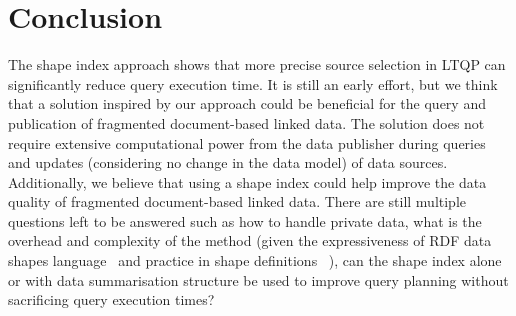 \section{Conclusion}

The shape index approach shows that more precise source selection in LTQP can significantly reduce query execution time.
It is still an early effort, but we think that a solution inspired by our approach could be beneficial for the query and publication of fragmented document-based linked data.
The solution does not require extensive computational power from the data publisher during queries and updates (considering no change in the data model) of data sources.
Additionally, we believe that using a shape index could help improve the data quality of fragmented document-based linked data.
There are still multiple questions left to be answered such as how to handle private data, what is the overhead and complexity of the method (given the expressiveness of RDF data shapes language~\cite{Delva2021, staworko_et_al:LIPIcs:2015:4985, 10.1007/978-3-319-68288-4_7} and practice in shape definitions~\cite{lieber_iswc_poster_2020, staworko_et_al:LIPIcs:2015:4985, Staworko2018ContainmentOS} ),
can the shape index alone or with data summarisation structure be used to improve query planning without sacrificing query execution times?
